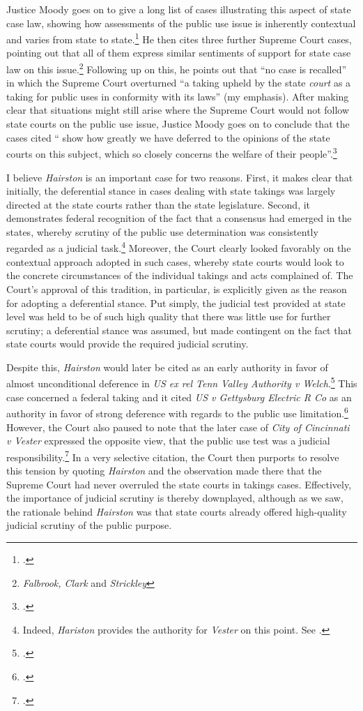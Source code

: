 \documentclass[12pt,a4paper]{book} %
\begin{document}
Justice Moody goes on to give a long list of cases illustrating this aspect of state case law, showing how assessments of the public use issue is inherently contextual and varies from state to state.\footcite[607]{hairston08} He then cites three further Supreme Court cases, pointing out that all of them express similar sentiments of support for state case law on this issue.\footnote{{\it Falbrook, Clark} and {\it Strickley}} Following up on this, he points out that ``no case is recalled'' in which the Supreme Court overturned ``a taking upheld by the state {\it court} as a taking for public uses in conformity with its laws'' (my emphasis). After making clear that situations might still arise where the Supreme Court would not follow state courts on the public use issue, Justice Moody goes on to conclude that the cases cited `` show how greatly we have deferred to the opinions of the state courts on this subject, which so closely concerns the welfare of their people''.\footcite[606]{hairston08}

I believe {\it Hairston} is an important case for two reasons. First, it makes clear that initially, the deferential stance in cases dealing with state takings was largely directed at the state courts rather than the state legislature. Second, it demonstrates federal recognition of the fact that a consensus had emerged in the states, whereby scrutiny of the public use determination was consistently regarded as a judicial task.\footnote{Indeed, {\it Hariston} provides the authority for {\it Vester} on this point. See \cite[606]{vester30}.} Moreover, the Court clearly looked favorably on the contextual approach adopted in such cases, whereby state courts would look to the concrete circumstances of the individual takings and acts complained of. The Court's approval of this tradition, in particular, is explicitly given as the reason for adopting a deferential stance. Put simply, the judicial test provided at state level was held to be of such high quality that there was little use for further scrutiny; a deferential stance was assumed, but made contingent on the fact that state courts would provide the required judicial scrutiny.

Despite this, {\it Hairston} would later be cited as an early authority in favor of almost unconditional deference in {\it US ex rel Tenn Valley Authority v Welch}.\footcite[552]{welch46} This case concerned a federal taking and it cited {\it US v Gettysburg Electric R Co} as an authority in favor of strong deference with regards to the public use limitation.\footcite{gettysburg96} However, the Court also paused to note that the later case of {\it City of Cincinnati v Vester} expressed the opposite view, that the public use test was a judicial responsibility.\footcite{vester30} In a very selective citation, the Court then purports to resolve this tension by quoting {\it Hairston} and the observation made there that the Supreme Court had never overruled the state courts in takings cases. Effectively, the importance of judicial scrutiny is thereby downplayed, although as we saw, the rationale behind {\it Hairston} was that state courts already offered high-quality judicial scrutiny of the public purpose.
\end{document}
